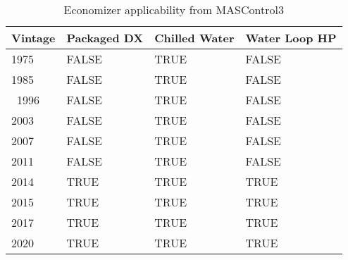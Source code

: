 \begin{table}[h!]
  \centering
  \small
  \caption[MASControl3 Economizer Applicability]{Economizer applicability from MASControl3}
  \label{tab:econ_applic_mascontrol3}
  \begin{tabular}{|p{0.75in}|p{1in}|p{1in}|p{1in}|}
  \hline
  \textbf{Vintage} &
  \textbf{Packaged DX} &
  \textbf{Chilled Water} &
  \textbf{Water Loop HP} \\ \hline
  1975  & FALSE & TRUE & FALSE \\ \hline
  1985  & FALSE & TRUE & FALSE \\ \hline
  ~1996 & FALSE & TRUE & FALSE \\ \hline
  2003  & FALSE & TRUE & FALSE \\ \hline
  2007  & FALSE & TRUE & FALSE \\ \hline
  2011  & FALSE & TRUE & FALSE \\ \hline
  2014  & TRUE  & TRUE & TRUE  \\ \hline
  2015  & TRUE  & TRUE & TRUE  \\ \hline
  2017  & TRUE  & TRUE & TRUE  \\ \hline
  2020  & TRUE  & TRUE & TRUE  \\ \hline
  \end{tabular}
  \end{table}